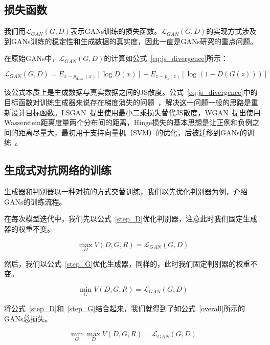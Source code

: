 \subsection{损失函数}

我们用$\mathcal{L}_{GAN}(G, D)$表示GANs训练的损失函数。$\mathcal{L}_{GAN}(G, D)$的实现方式涉及到GANs训练的稳定性和生成数据的真实度，因此一直是GANs研究的重点问题。

在原始GANs中，$\mathcal{L}_{GAN}(G, D)$的计算如公式~\ref{eq:js_divergence}所示：

\begin{equation}
    \mathcal{L}_{GAN}(G, D) = E_{x \sim p_{\text {data }}(x)}[\log D(x)]+E_{z \sim p_{z}(z)}[\log (1-D(G(z)))]
    \label{eq:js_divergence}
\end{equation}

该公式本质上是生成数据与真实数据之间的JS散度。公式~\ref{eq:js_divergence}中的目标函数对训练生成器来说存在梯度消失的问题~\cite{review}，解决这一问题一般的思路是重新设计目标函数。LSGAN~\cite{lsgan, lsgan2}提出使用最小二乘损失替代JS散度，WGAN~\cite{wgan}提出使用Wasserstein距离度量两个分布间的距离，Hinge损失的基本思想是让正例和负例之间的距离尽量大，最初用于支持向量机（SVM）的优化，后被迁移到GANs的训练~\cite{hinge1,hinge2,hinge3}。

\subsection{生成式对抗网络的训练}

生成器和判别器以一种对抗的方式交替训练，我们以先优化判别器为例，介绍GANs的训练流程。

在每次模型迭代中，我们先以公式~\ref{step_D}优化判别器，注意此时我们固定生成器的权重不变。

\begin{equation}
    \max _{D} V(D, G, R) = \mathcal{L}_{GAN}(G, D)
    \label{step_D}
\end{equation}

然后，我们以公式~\ref{step_G}优化生成器，同样的，此时我们固定判别器的权重不变。

\begin{equation}
    \min _{G} V(D, G, R) = \mathcal{L}_{GAN}(G, D)
    \label{step_G}
\end{equation}

将公式~\ref{step_D}和~\ref{step_G}结合起来，我们就得到了如公式~\ref{overall}所示的GANs总损失。

\begin{equation}
    \min _{G} \max _{D} V(D, G, R) = \mathcal{L}_{GAN}(G, D)
\end{equation}

